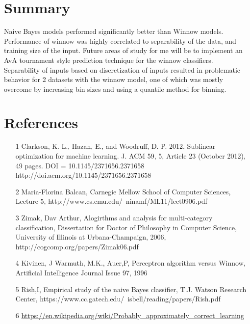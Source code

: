 \documentclass[11pt]{article}
\begin{document}
\section{Summary}
Naive Bayes models performed significantly better than Winnow models. Performance of winnow was highly correlated to separability of the data, and training size of the input. Future areas of study for me will be to implement an AvA tournament style prediction technique for the winnow classifiers. Separability of inputs based on discretization of inputs resulted in problematic behavior for 2 datasets with the winnow model, one of which was mostly overcome by increasing bin sizes and using a quantile method for binning.

\section{References} 
\begin{itemize}
\item[1]Clarkson, K. L., Hazan, E., and Woodruff, D. P. 2012. Sublinear optimization for machine learning. J. ACM 59, 5, Article 23 (October 2012), 49 pages. DOI = 10.1145/2371656.2371658 http://doi.acm.org/10.1145/2371656.2371658\\

\item[2] Maria-Florina Balcan, Carnegie Mellow School of Computer Sciences, Lecture 5, http://www.cs.cmu.edu/~ninamf/ML11/lect0906.pdf

\item[3] Zimak, Dav Arthur, Alogirthms and analysis for multi-category classification, Dissertation for Doctor of Philosophy in Computer Science, University of Illinois at Urbana-Champaign, 2006, http://cogcomp.org/papers/Zimak06.pdf

\item[4] Kivinen, J Warmuth, M.K., Auer,P, Perceptron algorithm versus Winnow, Artificial Intelligence Journal Issue 97, 1996 

\item[5] Rish,I, Empirical study of the naive Bayes classifier, T.J. Watson Research Center, https://www.cc.gatech.edu/~isbell/reading/papers/Rish.pdf

\item[6] \url{https://en.wikipedia.org/wiki/Probably_approximately_correct_learning}

\end{itemize}
\end{document}
